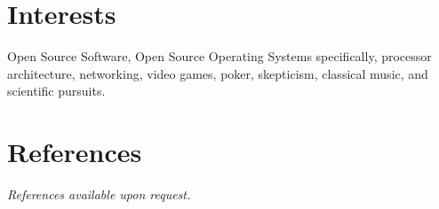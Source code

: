 \documentclass[margin,line]{resume}
\begin{document}
\begin{resume}
	\section{\mysidestyle Interests} 
	Open Source Software, Open Source Operating Systems specifically, processor
	architecture, networking, video games, poker, skepticism, classical music,
	and scientific pursuits.

	\section{\mysidestyle References}
	{\sl References available upon request.}
%	
%
%


\end{resume}
\end{document}
